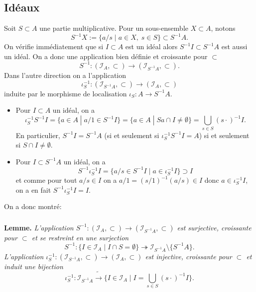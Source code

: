 \documentclass[a4paper, 12pt]{amsart}
\begin{document}
\subsection{Id\'eaux}\label{LocIdeal} 

\noindent Soit $S\subset A$ une partie multiplicative. Pour un sous-ensemble $X\subset A$, notons $$S^{-1}X:=\lbrace  a/s\;|\; a\in X,\; s\in S\rbrace \subset S^{-1}A. $$
On v\'erifie imm\'ediatement que si $I\subset A$ est un id\'eal alors $S^{-1}I\subset S^{-1}A$ est aussi un id\'eal. On a donc une application bien d\'efinie et croissante pour $\subset$
$$S^{-1}:(\mathcal{I}_A,\subset)\rightarrow (\mathcal{I}_{S^{-1}A},\subset).$$
Dans l'autre direction on a l'application $$\iota_S^{-1}:(\mathcal{I}_{S^{-1}A},\subset)\rightarrow (\mathcal{I}_A,\subset)$$ induite  par le morphisme de localisation $\iota_S:A\rightarrow S^{-1}A$. 
\begin{itemize}[leftmargin=* ,parsep=0cm,itemsep=0cm,topsep=0cm] 
\item Pour $I\subset A$ un id\'eal, on a 
$$\iota_S^{-1}S^{-1}I=\lbrace a\in A\;|\; a/1\in S^{-1}I\rbrace= \lbrace a\in A\;|\;  Sa\cap I\not=\emptyset\rbrace=\bigcup_{s\in S}(s\cdot)^{-1}I.$$
En particulier, $S^{-1}I=S^{-1}A$ (si et seulement si $\iota_S^{-1}S^{-1}I=A$) si et seulement si $S\cap I\not=\emptyset$.\\
\item Pour $I\subset S^{-1}A$ un id\'eal, on a 
$$S^{-1}\iota_S^{-1}I=\lbrace a/s\in S^{-1}I\;|\; a\in \iota_S^{-1}I\rbrace\supset I$$
et comme  pour tout $a/s\in I$ on a $a/1= (s/1)^{-1}(a/s)\in I$ donc $a\in \iota_S^{-1}I$, on a en fait $S^{-1}\iota_S^{-1}I=I$.\\
 \end{itemize}
 
\noindent On a donc montr\'e: 
 
\subsubsection{}\label{LocIdeaux}\textbf{Lemme.} \textit{L'application $S^{-1}:(\mathcal{I}_A,\subset)\rightarrow (\mathcal{I}_{S^{-1}A},\subset) $ est surjective, croissante pour $\subset$ et se restreint en une surjection    $$S^{-1}:\lbrace I\in\mathcal{I}_A\;|\; I\cap S=\emptyset\rbrace \twoheadrightarrow  \mathcal{I}_{S^{-1}A}\setminus \lbrace S^{-1}A\rbrace . $$
L'application $\iota_S^{-1}:(\mathcal{I}_{S^{-1}A},\subset) \rightarrow  (\mathcal{I}_A,\subset)$ est injective,  croissante pour $\subset$  et induit une bijection  
$$\iota_S^{-1}:\mathcal{I}_{S^{-1}A} \tilde{\rightarrow} \lbrace I\in\mathcal{I}_A\;|\; I=\bigcup_{s\in S}(s\cdot)^{-1}I\rbrace .$$}
\end{document}
